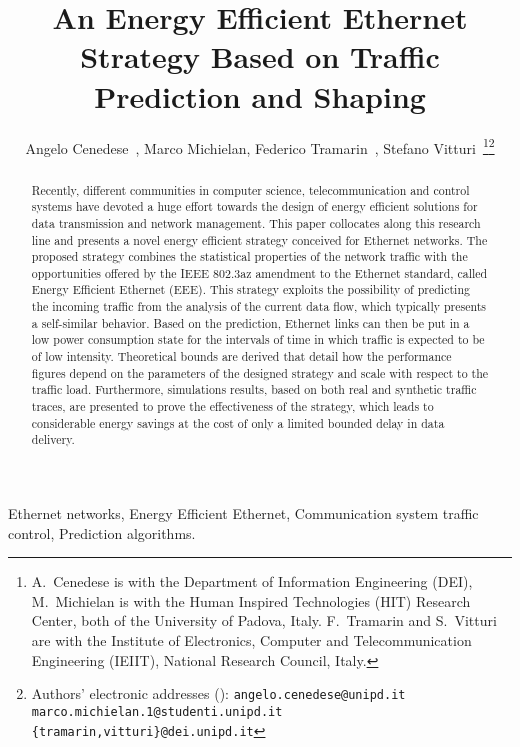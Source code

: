 \documentclass[journal,10pt,twoside,final]{IEEEtran}
\title{An Energy Efficient Ethernet Strategy Based on Traffic Prediction and Shaping}
\author{Angelo Cenedese~\IEEEmembership{Member,~IEEE}, Marco Michielan, Federico Tramarin~\IEEEmembership{Member,~IEEE}, Stefano Vitturi~\IEEEmembership{Member,~IEEE}\thanks{A.~\!Cenedese is with the Department of Information Engineering (DEI), M.~\!Michielan is with the Human Inspired Technologies (HIT) Research Center, both of the University of Padova, Italy. F.~\!Tramarin and S.~\!Vitturi are with the  Institute of Electronics, Computer and Telecommunication Engineering  (IEIIT), National Research Council, Italy.}\thanks{Authors' electronic addresses (\Letter): \newline
{\tt angelo.cenedese@unipd.it} \newline
{\tt marco.michielan.1@studenti.unipd.it} \newline
{\tt \{tramarin,vitturi\}@dei.unipd.it}
}}
\begin{document}
\maketitle


\begin{abstract}

Recently, different communities in computer science, telecommunication and control systems have devoted a huge effort towards the design of energy efficient solutions for data transmission and network management. This paper collocates along this research line and presents a novel energy efficient strategy conceived for Ethernet networks. 
The proposed strategy combines the statistical properties of the network traffic with the opportunities offered by the IEEE 802.3az amendment to the Ethernet standard, called Energy Efficient Ethernet (EEE). This strategy exploits the possibility of predicting the incoming traffic from the analysis of the current data flow, which typically presents a self-similar behavior. Based on the prediction, Ethernet links can then be put in a low power consumption state for the intervals of time in which traffic is expected to be of low intensity. 
Theoretical bounds are derived that detail how the performance figures depend on the parameters of the designed strategy and scale with respect to the traffic load.
Furthermore, simulations results, based on both real and synthetic traffic traces, are presented to prove the effectiveness of the strategy, which leads to considerable energy savings at the cost of only a limited bounded delay in data delivery.
\end{abstract}

\begin{IEEEkeywords}
Ethernet networks, Energy Efficient Ethernet, Communication system traffic control, Prediction algorithms.
\end{IEEEkeywords}

\IEEEpeerreviewmaketitle
\end{document}
